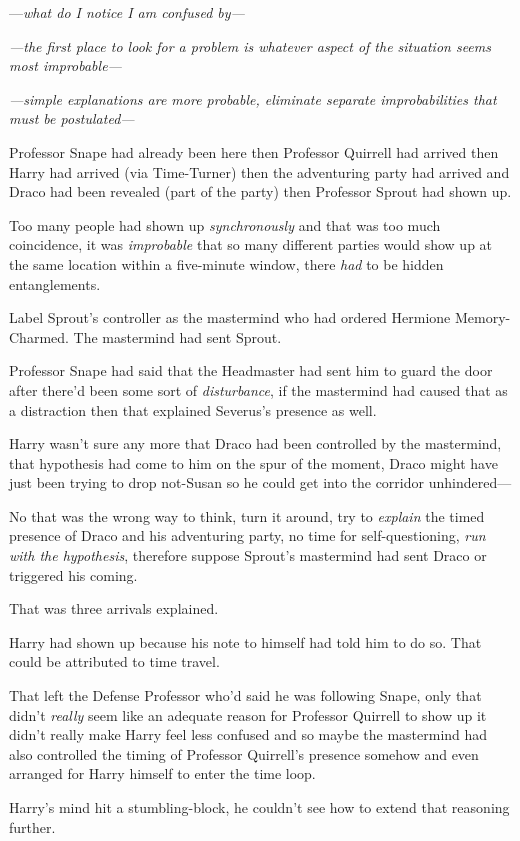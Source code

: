 —\emph{what do I notice I am confused by—}

\emph{—the first place to look for a problem is whatever aspect of the situation seems most improbable—}

\emph{—simple explanations are more probable, eliminate separate improbabilities that must be postulated—}

Professor Snape had already been here then Professor Quirrell had arrived then Harry had arrived (via Time-Turner) then the adventuring party had arrived and Draco had been revealed (part of the party) then Professor Sprout had shown up.

Too many people had shown up \emph{synchronously} and that was too much coincidence, it was \emph{improbable} that so many different parties would show up at the same location within a five-minute window, there \emph{had} to be hidden entanglements.

Label Sprout's controller as the mastermind who had ordered Hermione Memory-Charmed. The mastermind had sent Sprout.

Professor Snape had said that the Headmaster had sent him to guard the door after there'd been some sort of \emph{disturbance}, if the mastermind had caused that as a distraction then that explained Severus's presence as well.

Harry wasn't sure any more that Draco had been controlled by the mastermind, that hypothesis had come to him on the spur of the moment, Draco might have just been trying to drop not-Susan so he could get into the corridor unhindered—

No that was the wrong way to think, turn it around, try to \emph{explain} the timed presence of Draco and his adventuring party, no time for self-questioning, \emph{run with the hypothesis}, therefore suppose Sprout's mastermind had sent Draco or triggered his coming.

That was three arrivals explained.

Harry had shown up because his note to himself had told him to do so. That could be attributed to time travel.

That left the Defense Professor who'd said he was following Snape, only that didn't \emph{really} seem like an adequate reason for Professor Quirrell to show up it didn't really make Harry feel less confused and so maybe the mastermind had also controlled the timing of Professor Quirrell's presence somehow and even arranged for Harry himself to enter the time loop.

Harry's mind hit a stumbling-block, he couldn't see how to extend that reasoning further.

